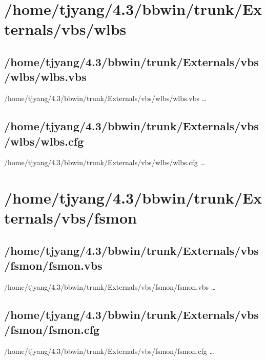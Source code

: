 \section{/home/tjyang/4.3/bbwin/trunk/Externals/vbs/wlbs}

\subsection{/home/tjyang/4.3/bbwin/trunk/Externals/vbs/wlbs/wlbs.vbs}
\lstset{numberstyle=\tiny,numbers=left,
   breaklines=true,
   stepnumber=1,numbersep=5pt,firstnumber=1,
   xleftmargin=12pt,showstringspaces=false}
\noindent /home/tjyang/4.3/bbwin/trunk/Externals/vbs/wlbs/wlbs.vbs  \ldots



\subsection{/home/tjyang/4.3/bbwin/trunk/Externals/vbs/wlbs/wlbs.cfg}
\lstset{numberstyle=\tiny,numbers=left,
   breaklines=true,
   stepnumber=1,numbersep=5pt,firstnumber=1,
   xleftmargin=12pt,showstringspaces=false}
\noindent /home/tjyang/4.3/bbwin/trunk/Externals/vbs/wlbs/wlbs.cfg  \ldots



\section{/home/tjyang/4.3/bbwin/trunk/Externals/vbs/fsmon}

\subsection{/home/tjyang/4.3/bbwin/trunk/Externals/vbs/fsmon/fsmon.vbs}
\lstset{numberstyle=\tiny,numbers=left,
   breaklines=true,
   stepnumber=1,numbersep=5pt,firstnumber=1,
   xleftmargin=12pt,showstringspaces=false}
\noindent /home/tjyang/4.3/bbwin/trunk/Externals/vbs/fsmon/fsmon.vbs  \ldots



\subsection{/home/tjyang/4.3/bbwin/trunk/Externals/vbs/fsmon/fsmon.cfg}
\lstset{numberstyle=\tiny,numbers=left,
   breaklines=true,
   stepnumber=1,numbersep=5pt,firstnumber=1,
   xleftmargin=12pt,showstringspaces=false}
\noindent /home/tjyang/4.3/bbwin/trunk/Externals/vbs/fsmon/fsmon.cfg  \ldots



